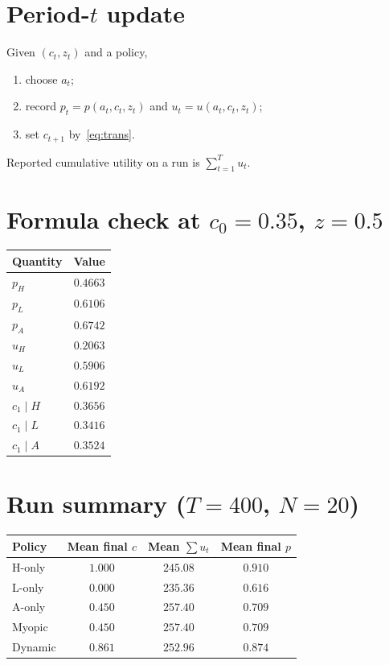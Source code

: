 \documentclass[11pt]{article}
\begin{document}
\section{Period-\(t\) update}
Given \((c_t,z_t)\) and a policy,
\begin{enumerate}
  \item choose \(a_t\);
  \item record \(p_t=p(a_t,c_t,z_t)\) and \(u_t=u(a_t,c_t,z_t)\);
  \item set \(c_{t+1}\) by~\eqref{eq:trans}.
\end{enumerate}
Reported cumulative utility on a run is \(\sum_{t=1}^{T}u_t\).

\section{Formula check at \(c_0=0.35\), \(z=0.5\)}
\begin{center}
\begin{tabular}{@{}lc@{}}
\toprule
Quantity & Value \\
\midrule
\(p_H\) & \(0.4663\) \\
\(p_L\) & \(0.6106\) \\
\(p_A\) & \(0.6742\) \\
\(u_H\) & \(0.2063\) \\
\(u_L\) & \(0.5906\) \\
\(u_A\) & \(0.6192\) \\
\(c_1\mid H\) & \(0.3656\) \\
\(c_1\mid L\) & \(0.3416\) \\
\(c_1\mid A\) & \(0.3524\) \\
\bottomrule
\end{tabular}
\end{center}

\section{Run summary (\(T=400\), \(N=20\))}
\begin{center}
\begin{tabular}{@{}lccc@{}}
\toprule
Policy & Mean final \(c\) & Mean \(\sum u_t\) & Mean final \(p\) \\
\midrule
H-only & \(1.000\) & \(245.08\) & \(0.910\) \\
L-only & \(0.000\) & \(235.36\) & \(0.616\) \\
A-only & \(0.450\) & \(257.40\) & \(0.709\) \\
Myopic & \(0.450\) & \(257.40\) & \(0.709\) \\
Dynamic & \(0.861\) & \(252.96\) & \(0.874\) \\
\bottomrule
\end{tabular}
\end{center}
\end{document}
